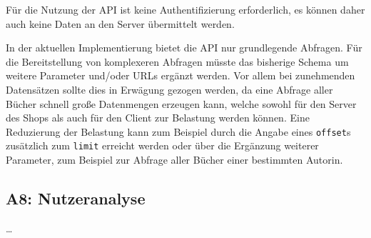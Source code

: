 	Für die Nutzung der API ist keine Authentifizierung erforderlich, es können daher auch keine Daten an den Server übermittelt werden.
	
	In der aktuellen Implementierung bietet die API nur grundlegende Abfragen. Für die Bereitstellung von komplexeren Abfragen müsste das bisherige Schema um weitere Parameter und/oder URLs ergänzt werden. Vor allem bei zunehmenden Datensätzen sollte dies in Erwägung gezogen werden, da eine Abfrage aller Bücher schnell große Datenmengen erzeugen kann, welche sowohl für den Server des Shops als auch für den Client zur Belastung werden können. Eine Reduzierung der Belastung kann zum Beispiel durch die Angabe eines \lstinline|offset|s zusätzlich zum \lstinline|limit| erreicht werden oder über die Ergänzung weiterer Parameter, zum Beispiel zur Abfrage aller Bücher einer bestimmten Autorin.
	
	\subsection{A8: Nutzeranalyse}
	\dots
	
	